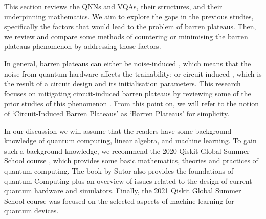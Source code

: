This section reviews the QNNs and VQAs, their structures, and their underpinning mathematics. 
We aim to explore the gaps in the previous studies, specifically the factors that would lead to the problem of barren plateaus.
Then, we review and compare some methods of countering or minimising the barren plateaus phenomenon by addressing those factors.

In general, barren plateaus can either be noise-induced \cite{wangNoiseinducedBarrenPlateaus2021}, which means that the noise from quantum hardware affects the trainability; 
or circuit-induced \cite{mccleanBarrenPlateausQuantum2018}, which is the result of a circuit design and its initialisation parameters.
This research focuses on mitigating circuit-induced barren plateaus by reviewing some of the prior studies of this phenomenon \cite{pesahAbsenceBarrenPlateaus2021, cerezoCostFunctionDependent2021, skolikLayerwiseLearningQuantum2021}.
From this point on, we will refer to the notion of `Circuit-Induced Barren Plateaus' as `Barren Plateaus' for simplicity.

In our discussion we will assume that the readers have some background knowledge of quantum computing, linear algebra, and machine learning. 
To gain such a background knowledge, we recommend the 2020 Qiskit Global Summer School course \cite{2020QiskitGlobal}, which provides some basic mathematics, theories and practices of quantum computing. 
The book by Sutor \cite{sutorDancingQubitsHow2019} also provides the foundations of quantum Computing plus an overview of issues related to the design of current quantum hardware and simulators.
Finally, the 2021 Qiskit Global Summer School course \cite{2021QiskitGlobala} was focused on the selected aspects of machine learning for quantum devices.